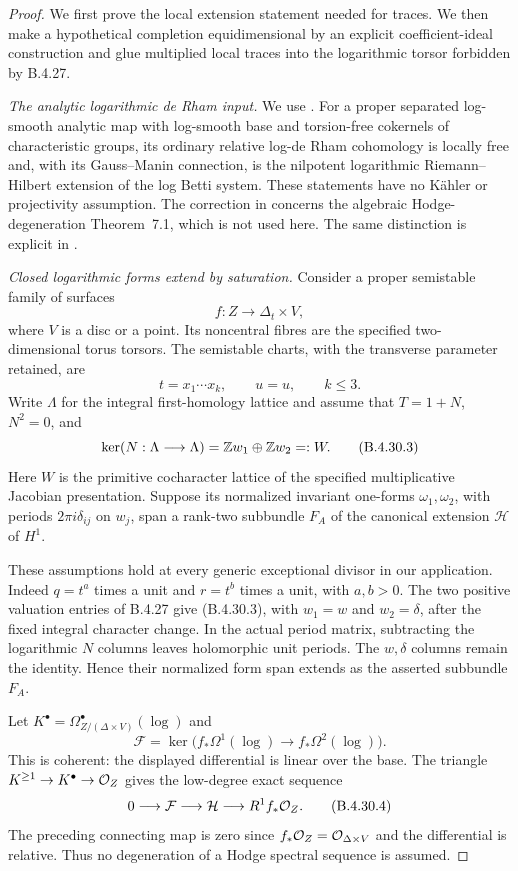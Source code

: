 \begin{proof}
We first prove the local extension statement
needed for traces. We then make a hypothetical
completion equidimensional by an explicit
coefficient-ideal construction and glue multiplied
local traces into the logarithmic torsor
forbidden by B.4.27.

\emph{The analytic logarithmic de Rham input.}
We use \citet[Theorems 6.2 and 6.3,
pp.~32 and 34]{IKN2005E}. For a proper separated
log-smooth analytic map with log-smooth base and
torsion-free cokernels of characteristic groups,
its ordinary relative log-de Rham cohomology is
locally free and, with its Gauss--Manin
connection, is the nilpotent logarithmic
Riemann--Hilbert extension of the log Betti
system. These statements have no K\"ahler or
projectivity assumption. The correction in
\citet{IKN2007ErratumE} concerns the algebraic
Hodge-degeneration Theorem~7.1, which is not
used here. The same distinction is explicit in
\citet[Definition 7.1(i) and Section 9.2,
pp.~164--165 and 173]{KKN2008PicardE}.

\emph{Closed logarithmic forms extend by saturation.}
Consider a proper semistable family of surfaces
\[
 f:Z\longrightarrow\Delta_t\times V,
 \tag{B.4.30.1}
\]
where $V$ is a disc or a point. Its noncentral
fibres are the specified two-dimensional torus
torsors. The semistable charts, with the
transverse parameter retained, are
\[
 t=x_1\cdots x_k,\qquad u=u,\qquad k\le3.
 \tag{B.4.30.2}
\]
Write $\Lambda$ for the integral first-homology
lattice and assume that $T=1+N$, $N^2=0$, and
\[
 \ker(N:\Lambda\longrightarrow\Lambda)
       =\mathbb Z w_1\oplus\mathbb Z w_2=:W.
 \tag{B.4.30.3}
\]
Here $W$ is the primitive cocharacter lattice
of the specified multiplicative Jacobian
presentation. Suppose its normalized invariant
one-forms $\omega_1,\omega_2$, with periods
$2\pi i\delta_{ij}$ on $w_j$, span a rank-two
subbundle $F_A$ of the canonical extension
$\mathcal H$ of $H^1$.

These assumptions hold at every generic
exceptional divisor in our application. Indeed
$q=t^a$ times a unit and $r=t^b$ times a unit,
with $a,b>0$. The two positive valuation entries
of B.4.27 give (B.4.30.3), with $w_1=w$ and
$w_2=\delta$, after the fixed integral character
change. In the actual period matrix, subtracting
the logarithmic $N$ columns leaves holomorphic
unit periods. The $w,\delta$ columns remain
the identity. Hence their normalized form span
extends as the asserted subbundle $F_A$.

Let $K^\bullet=\Omega^\bullet_{Z/(\Delta\times V)}
(\log)$ and
\[
 \mathcal F=\ker\bigl(f_*\Omega^1(\log)
                   \longrightarrow f_*\Omega^2(\log)\bigr).
\]
This is coherent: the displayed differential
is linear over the base. The triangle
$K^{\ge1}\to K^\bullet\to\mathcal O_Z$ gives the
low-degree exact sequence
\[
 0\longrightarrow\mathcal F
 \longrightarrow\mathcal H
 \longrightarrow R^1f_*\mathcal O_Z.
 \tag{B.4.30.4}
\]
The preceding connecting map is zero since
$f_*\mathcal O_Z=\mathcal O_{\Delta\times V}$ and the
differential is relative. Thus no degeneration
of a Hodge spectral sequence is assumed.


\end{proof}
